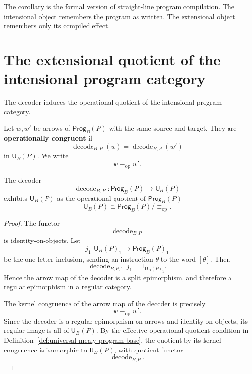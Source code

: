 The corollary is the formal version of straight-line program compilation.  The intensional object
remembers the program as written.  The extensional object remembers only its compiled effect.

\section{The extensional quotient of the intensional program category}
\label{sec:extensional-quotient-intensional-language}

The decoder induces the operational quotient of the intensional program category.

\begin{definition}
Let \(w,w'\) be arrows of \(\mathsf{Prog}_B(P)\) with the same source and target.  They are
\textbf{operationally congruent} if
\[
        \operatorname{decode}_{B,P}(w)
        =
        \operatorname{decode}_{B,P}(w')
\]
in \(\mathsf U_B(P)\).  We write
\[
        w\equiv_{\operatorname{op}} w'.
\]
\end{definition}

\begin{theorem}
\label{thm:prog-quotient-u}
The decoder
\[
        \operatorname{decode}_{B,P}:
        \mathsf{Prog}_B(P)\longrightarrow\mathsf U_B(P)
\]
exhibits \(\mathsf U_B(P)\) as the operational quotient of
\(\mathsf{Prog}_B(P)\):
\[
        \mathsf U_B(P)
        \cong
        \mathsf{Prog}_B(P)/{\equiv_{\operatorname{op}}}.
\]
\end{theorem}

\begin{proof}
The functor
\[
        \operatorname{decode}_{B,P}
\]
is identity-on-objects.  Let
\[
        j_1:\mathsf U_B(P)_1\longrightarrow \mathsf{Prog}_B(P)_1
\]
be the one-letter inclusion, sending an instruction \(\theta\) to the word \([\theta]\).  Then
\[
        \operatorname{decode}_{B,P,1}\,j_1
        =
        1_{\mathsf U_B(P)_1}.
\]
Hence the arrow map of the decoder is a split epimorphism, and therefore a regular epimorphism in
a regular category.

The kernel congruence of the arrow map of the decoder is precisely
\[
        w\equiv_{\operatorname{op}}w'.
\]
Since the decoder is a regular epimorphism on arrows and identity-on-objects, its regular image is
all of \(\mathsf U_B(P)\).  By the effective operational quotient condition in
Definition~\ref{def:universal-mealy-program-base}, the quotient by its kernel congruence is
isomorphic to \(\mathsf U_B(P)\), with quotient functor
\[
        \operatorname{decode}_{B,P}.
\]
\end{proof}

